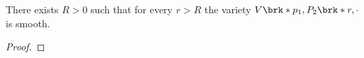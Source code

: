 \begin{proposition}[Smoothness]\label{pr:n3_polynomial_smoothness}
  There exists $R>0$ such that for every $r>R$ the variety $V\brk*{p_1,P_2\brk*{r,\cdot}}$ is smooth.
\end{proposition}
\begin{proof}

\end{proof}
